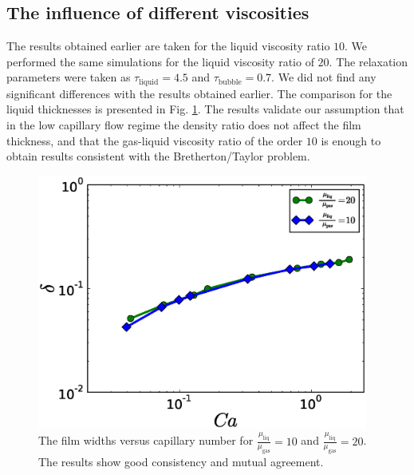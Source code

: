 \documentclass{article}
\begin{document}
\subsection{The influence of different viscosities}
The results obtained earlier are taken for the liquid viscosity ratio $10$.
We performed the same simulations for the liquid viscosity ratio of $20$.
The relaxation parameters were taken as $\tau_{\mathrm{liquid}}=4.5$ and $\tau_{\mathrm{bubble}}=0.7$. We
did not find any significant differences with the results obtained earlier. The
comparison for the liquid thicknesses is presented in Fig.
\ref{fig:capillary:viscous}. The results validate our assumption that in
the low capillary flow regime the density ratio does not affect the film thickness,
and that the gas-liquid viscosity ratio of the order $10$ is enough to obtain results
consistent with the Bretherton/Taylor problem.
\begin{figure}
\includegraphics[width=0.97\textwidth]{Figures/Capillary_Viscous/capillaries_viscous.eps}
\caption{The film widths versus capillary number for
$\frac{\mu_{\mathrm{liq}}}{\mu_{\mathrm{gas}}}=10$ and $\frac{\mu_{\mathrm{liq}}}{\mu_{\mathrm{gas}}}=20$. The
results show good consistency and mutual agreement.\label{fig:capillary:viscous}}
\end{figure}
\end{document}
